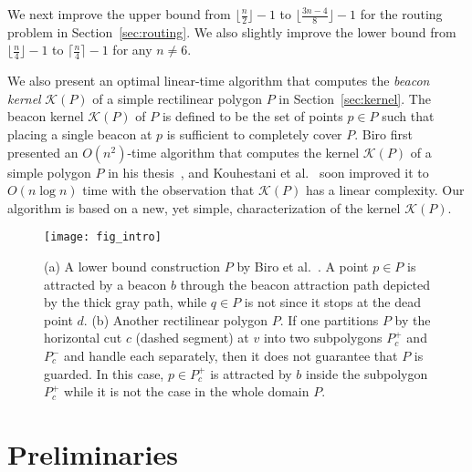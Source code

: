 \documentclass[11pt]{article}
\newcommand{\Kernel}{\mathcal{K}}
\theoremstyle{definition}
\begin{document}
We next improve the upper bound from $\lfloor \frac{n}{2}\rfloor-1$ to $\lfloor \frac{3n-4}{8} \rfloor - 1$ for
the routing problem in Section~\ref{sec:routing}. We also slightly improve the lower bound from $\lfloor \frac{n}{4}\rfloor - 1$ to $\lceil \frac{n}{4}\rceil -1$ for any $n\neq 6$. 

We also present an optimal linear-time algorithm that computes the \emph{beacon kernel}
$\Kernel(P)$ of a simple rectilinear polygon $P$ in Section~\ref{sec:kernel}.
The {beacon kernel} $\Kernel(P)$ of $P$ is defined to be
the set of points $p\in P$ such that placing a single beacon at $p$ is sufficient to completely cover $P$.
Biro first presented an $O(n^2)$-time algorithm that computes the kernel $\Kernel(P)$
of a simple polygon $P$ in his thesis~\cite{b-bbrg-13},
and  Kouhestani et al.~\cite{krs-cccg-14} soon improved it to $O(n\log n)$ time
with the observation that $\Kernel(P)$ has a linear complexity.
Our algorithm is based on a new, yet simple, characterization of the kernel $\Kernel(P)$.


\begin{figure}[tb]
\centering
\texttt{[image: fig\_intro]}
\caption{(a) A lower bound construction $P$ by Biro et al.~\cite{bgikm-cccg-13}.
 A point $p \in P$ is attracted by a beacon $b$ through the beacon attraction path
 depicted by the thick gray path, while $q \in P$ is not since it stops at the dead point $d$.
 (b) Another rectilinear polygon $P$. If one partitions $P$ by the horizontal cut $c$ (dashed segment) 
 at $v$ into two subpolygons $P^+_c$ and $P^-_c$ and handle each separately,
 then it does not guarantee that $P$ is guarded.
 In this case, $p\in P^+_c$ is attracted by $b$ inside the subpolygon $P^+_c$
 while it is not the case in the whole domain $P$.}
\label{fig:intro}
\end{figure}


\section{Preliminaries} \label{sec:pre}
\end{document}
